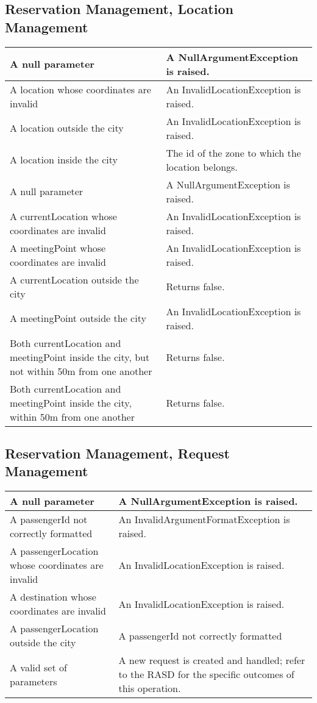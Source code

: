 \subsection{Reservation Management, Location Management}
\begin{tabular}{p{5cm}|p{6cm}}
\hline
	\method{getZone(location)}
	A null parameter &
	A NullArgumentException is raised.\\\hline
	A location whose coordinates are invalid &
	An InvalidLocationException is raised. \\\hline
	A location outside the city &
	An InvalidLocationException is raised. \\\hline
	A location inside the city &
	The id of the zone to which the location belongs. \\\hline\hline
			
	\method{checkTaxiDriverLocation(currentLocation, meetingPoint)}
	A null parameter &
	A NullArgumentException is raised. \\\hline
	A currentLocation whose coordinates are invalid &
	An InvalidLocationException is raised. \\\hline
	A meetingPoint whose coordinates are invalid &
	An InvalidLocationException is raised. \\\hline
	A currentLocation outside the city &
	Returns false. \\\hline
	A meetingPoint outside the city & 
	An InvalidLocationException is raised. \\\hline
	Both currentLocation and meetingPoint inside the city, but not within 50m from one another &
	Returns false. \\\hline
	Both currentLocation and meetingPoint inside the city, within 50m  from one another &
	Returns false. \\\hline\hline
\end{tabular}


\subsection{Reservation Management, Request Management}
\begin{tabular}{p{5cm}|p{6cm}}
\hline
	\method{requestTaxi(passengerId, passengerLocation, destination)}
	A null parameter &
	A NullArgumentException is raised.\\\hline
	A passengerId not correctly formatted &
	An InvalidArgumentFormatException is raised. \\\hline
	A passengerLocation whose coordinates are invalid &
	An InvalidLocationException is raised. \\\hline
	A destination whose coordinates are invalid &
	An InvalidLocationException is raised. \\\hline
	A passengerLocation outside the city &
	A passengerId not correctly formatted \\\hline
	A valid set of parameters &
	A new request is created and handled; refer to the RASD for the specific outcomes of this operation. \\\hline\hline
\end{tabular}


